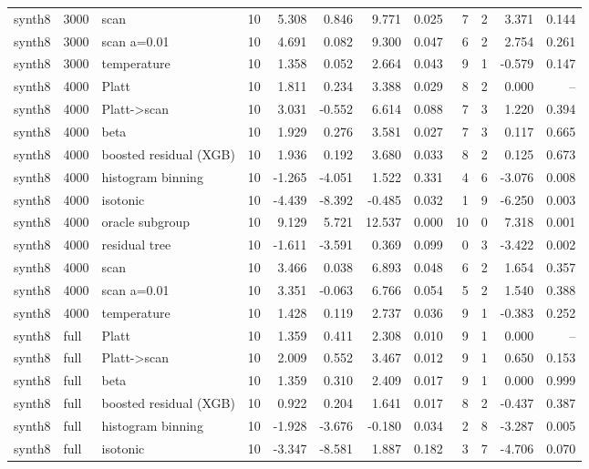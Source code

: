 \begin{tabular}{lllrrrrrrrrr}
synth8 & 3000 & scan & 10 & 5.308 & 0.846 & 9.771 & 0.025 & 7 & 2 & 3.371 & 0.144 \\
synth8 & 3000 & scan a=0.01 & 10 & 4.691 & 0.082 & 9.300 & 0.047 & 6 & 2 & 2.754 & 0.261 \\
synth8 & 3000 & temperature & 10 & 1.358 & 0.052 & 2.664 & 0.043 & 9 & 1 & -0.579 & 0.147 \\
synth8 & 4000 & Platt & 10 & 1.811 & 0.234 & 3.388 & 0.029 & 8 & 2 & 0.000 & -- \\
synth8 & 4000 & Platt->scan & 10 & 3.031 & -0.552 & 6.614 & 0.088 & 7 & 3 & 1.220 & 0.394 \\
synth8 & 4000 & beta & 10 & 1.929 & 0.276 & 3.581 & 0.027 & 7 & 3 & 0.117 & 0.665 \\
synth8 & 4000 & boosted residual (XGB) & 10 & 1.936 & 0.192 & 3.680 & 0.033 & 8 & 2 & 0.125 & 0.673 \\
synth8 & 4000 & histogram binning & 10 & -1.265 & -4.051 & 1.522 & 0.331 & 4 & 6 & -3.076 & 0.008 \\
synth8 & 4000 & isotonic & 10 & -4.439 & -8.392 & -0.485 & 0.032 & 1 & 9 & -6.250 & 0.003 \\
synth8 & 4000 & oracle subgroup & 10 & 9.129 & 5.721 & 12.537 & 0.000 & 10 & 0 & 7.318 & 0.001 \\
synth8 & 4000 & residual tree & 10 & -1.611 & -3.591 & 0.369 & 0.099 & 0 & 3 & -3.422 & 0.002 \\
synth8 & 4000 & scan & 10 & 3.466 & 0.038 & 6.893 & 0.048 & 6 & 2 & 1.654 & 0.357 \\
synth8 & 4000 & scan a=0.01 & 10 & 3.351 & -0.063 & 6.766 & 0.054 & 5 & 2 & 1.540 & 0.388 \\
synth8 & 4000 & temperature & 10 & 1.428 & 0.119 & 2.737 & 0.036 & 9 & 1 & -0.383 & 0.252 \\
synth8 & full & Platt & 10 & 1.359 & 0.411 & 2.308 & 0.010 & 9 & 1 & 0.000 & -- \\
synth8 & full & Platt->scan & 10 & 2.009 & 0.552 & 3.467 & 0.012 & 9 & 1 & 0.650 & 0.153 \\
synth8 & full & beta & 10 & 1.359 & 0.310 & 2.409 & 0.017 & 9 & 1 & 0.000 & 0.999 \\
synth8 & full & boosted residual (XGB) & 10 & 0.922 & 0.204 & 1.641 & 0.017 & 8 & 2 & -0.437 & 0.387 \\
synth8 & full & histogram binning & 10 & -1.928 & -3.676 & -0.180 & 0.034 & 2 & 8 & -3.287 & 0.005 \\
synth8 & full & isotonic & 10 & -3.347 & -8.581 & 1.887 & 0.182 & 3 & 7 & -4.706 & 0.070 \\

\end{tabular}

